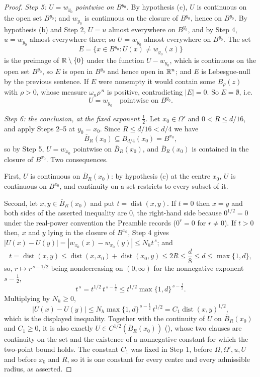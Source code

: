 \begin{proof}
\emph{Step 5: $U=w_{y_0}$ pointwise on $B^{y_0}$.}  By hypothesis (c), $U$ is
continuous on the open set $B^{y_0}$; and $w_{y_0}$ is continuous on the closure
of $B^{y_0}$, hence on $B^{y_0}$.  By hypothesis (b) and Step 2, $U=u$ almost
everywhere on $B^{y_0}$, and by Step 4, $u=w_{y_0}$ almost everywhere there; so
$U=w_{y_0}$ almost everywhere on $B^{y_0}$.  The set
\[
E=\{x\in B^{y_0}:U(x)\ne w_{y_0}(x)\}
\]
is the preimage of $\mathbb{R}\setminus\{0\}$ under the function $U-w_{y_0}$, which is
continuous on the open set $B^{y_0}$, so $E$ is open in $B^{y_0}$ and hence open
in $\mathbb{R}^n$; and $E$ is Lebesgue-null by the previous sentence.  If $E$ were
nonempty it would contain some $B_\rho(z)$ with $\rho>0$, whose measure
$\omega_n\rho^{\,n}$ is positive, contradicting $|E|=0$.  So $E=\emptyset$, i.e.
\[
U=w_{y_0}\quad\text{pointwise on }B^{y_0}.
\]

\emph{Step 6: the conclusion, at the fixed exponent $\tfrac12$.}  Let
$x_0\in\Omega'$ and $0<R\le d/16$, and apply Steps 2--5 at $y_0=x_0$.  Since
$R\le d/16<d/4$ we have
\[
\overline B_R(x_0)\subseteq B_{d/4}(x_0)=B^{x_0},
\]
so by Step 5, $U=w_{x_0}$ pointwise on $\overline B_R(x_0)$, and
$\overline B_R(x_0)$ is contained in the closure of $B^{x_0}$.  Two consequences.

First, $U$ is continuous on $\overline B_R(x_0)$: by hypothesis (c) at the
centre $x_0$, $U$ is continuous on $B^{x_0}$, and continuity on a set restricts
to every subset of it.

Second, let $x,y\in\overline B_R(x_0)$ and put
$t=\operatorname{dist}(x,y)$.  If $t=0$ then $x=y$ and both sides of the
asserted inequality are $0$, the right-hand side because $0^{1/2}=0$ under the
real-power convention the Preamble records ($0^{r}=0$ for $r\ne0$).  If $t>0$
then, $x$ and $y$ lying in the closure of $B^{x_0}$, Step 4 gives
$|U(x)-U(y)|=|w_{x_0}(x)-w_{x_0}(y)|\le N_ht^{\,s}$; and
\[
t=\operatorname{dist}(x,y)\le\operatorname{dist}(x,x_0)+
\operatorname{dist}(x_0,y)\le2R\le\frac d8\le d\le\max\{1,d\},
\]
so, $r\mapsto r^{\,s-1/2}$ being nondecreasing on $(0,\infty)$ for the
nonnegative exponent $s-\tfrac12$,
\[
t^{\,s}=t^{1/2}\,t^{\,s-\frac12}\le t^{1/2}\max\{1,d\}^{\,s-\frac12}.
\]
Multiplying by $N_h\ge0$,
\[
|U(x)-U(y)|\le N_h\max\{1,d\}^{\,s-\frac12}\,t^{1/2}
=C_1\operatorname{dist}(x,y)^{1/2},
\]
which is the displayed inequality.  Together with the continuity of $U$ on
$\overline B_R(x_0)$ and $C_1\ge0$, it is also exactly
$U\in C^{1/2}(\overline B_R(x_0))$ (), whose two clauses
are continuity on the set and the existence of a nonnegative constant for which
the two-point bound holds.  The constant $C_1$ was fixed in Step 1, before
$\Omega,\Omega',u,U$ and before $x_0$ and $R$, so it is one constant for every
centre and every admissible radius, as asserted.
\end{proof}
